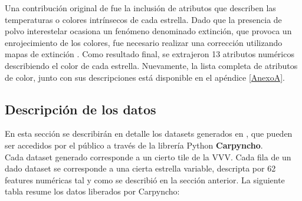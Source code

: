 \par Una contribución original de \cite{jbc} fue la inclusión de atributos que describen las temperaturas o colores intrínsecos de cada estrella.  Dado que la presencia de polvo interestelar ocasiona un fenómeno denominado extinción, que provoca un enrojecimiento de los colores, fue necesario realizar una corrección utilizando mapas de extinción \cite{mcwilliam2011rr}. Como resultado final, se extrajeron 13 atributos numéricos describiendo el color de cada estrella. Nuevamente, la lista completa de atributos de color, junto con sus descripciones está disponible en el apéndice \ref{AnexoA}.

\subsection{Descripción de los datos}
\label{tiles_description}
En esta sección se describirán en detalle los datasets generados en \cite{jbc}, que pueden ser accedidos por el público a través de la librería Python \textbf{Carpyncho}\cite{carpynchoToolkit}.\\

Cada dataset generado corresponde a un cierto tile de la VVV. Cada fila de un dado dataset se corresponde a una cierta estrella variable, descripta por 62 features numéricas tal y como se describió en la sección anterior. La siguiente tabla resume los datos liberados por Carpyncho:


